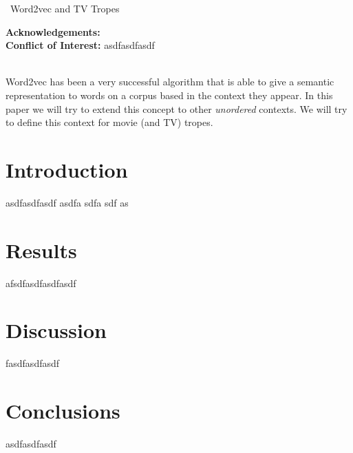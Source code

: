 \documentclass[]{article}
\date{}
\makeatletter
\def\wileyIndent{1pt}
\renewenvironment{abstract}
{\vspace*{-1pc}\trivlist\item[]\leftskip\wileyIndent\hrulefill\par\vskip4pt\noindent\textbf{\abstractname}\mbox{\null}\\}{\par\noindent\hrulefill\endtrivlist}
\def\author#1{\gdef\@author{\hskip-\dimexpr(\tabcolsep)\hskip\wileyIndent\parbox{\dimexpr\textwidth-\wileyIndent}{\centering\bfseries#1}}}
\def\title#1{\gdef\@title{\centering\bfseries\ifx\@articleType\@empty\else\@articleType\\\fi#1}}
\let\@articleType\@empty \def\articletype#1{\gdef\@articleType{{\normalfont\itshape#1}}}
\def\thanksspace{{\phantom{\textsuperscript{\thefootnote}}}}
\makeatother
\begin{document}
\title{Anything2vec: generalizing word2vec via the use of meaningful contexts}
\author{JJ Merelo\thanks{E-mail:                     
                    jmerelo@ugr.es}{\thanksspace}}

\def\RunningHead{}\def\RunningAuthor{JJ Merelo}

\maketitle 


\def\RunningHead{{Word2vec and TV Tropes}}
\begin{center}
\par\vskip1pc~\RunningHead ~\\
\end{center}
\noindent\textbf{Acknowledgements: }~\\\noindent\textbf{Conflict of Interest: } asdfasdfasdf


\begin{abstract}
  Word2vec has been a very successful algorithm that is able to give a
  semantic representation to words on a corpus based in the context
  they appear. In this paper we will try to extend this concept to
  other {\em unordered} contexts. We will try to define this context
  for movie (and TV) tropes.
  
  \def\keywordstitle{Keywords}
\end{abstract}
    
\section{Introduction}
 asdfasdfasdf asdfa sdfa sdf as
    
\section{Results}
 afsdfasdfasdfasdf
    
\section{Discussion}
 fasdfasdfasdf
    
\section{Conclusions}
asdfasdfasdf
    





\end{document}

